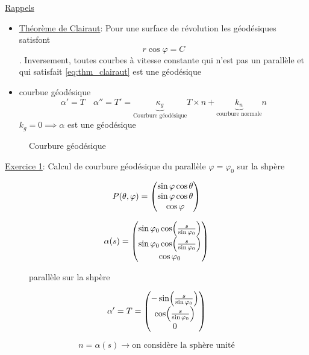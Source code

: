 



\underline{Rappels} 

\begin{itemize}

\item \underline{Théorème de Clairaut}: Pour une surface de révolution les géodésiques satisfont \begin{equation*}
	r\cos\varphi =C \tag{*} \label{eq:thm_clairaut}
\end{equation*}. Inversement, toutes courbes à vitesse constante qui n'est pas un parallèle et qui satisfait \eqref{eq:thm_clairaut} est une géodésique

\item courbue géodésique $$\alpha'=T \quad \alpha'' =T' = \underbrace{\kappa_{g}}_{\text{Courbure géodésique}}  T \times  n + \underbrace{k_{n}}_{\text{courbure normale}} n $$ $k_{g} = 0 \implies \alpha$ est une géodésique 
\end{itemize}
	

\begin{figure}[ht]
    \centering
    \caption{Courbure géodésique}
    \label{fig:courbure-géodésique}
\end{figure}


\underline{Exercice 1}: Calcul de courbure géodésique du parallèle $\varphi = \varphi_{0} $ sur la shpère

$$P(\theta, \varphi) = \begin{pmatrix} \sin\varphi\cos\theta\\\sin\varphi\cos\theta\\\cos\varphi \end{pmatrix} $$ 

$$\alpha(s) = \begin{pmatrix} \sin\varphi_{0} \cos(\frac{s}{\sin\varphi_{0} } )\\\sin\varphi_{0} \cos(\frac{s}{\sin\varphi_{0}} ) \\\cos\varphi_{0}  \end{pmatrix}$$ 

\begin{figure}[ht]
    \centering
    \caption{parallèle sur la shpère}
    \label{fig:parallèle-sur-la-shpère}
\end{figure}

$$\alpha' = T = \begin{pmatrix} -\sin(\frac{s}{\sin\varphi_{0}}) \\ \cos(\frac{s}{\sin\varphi_{0} }) \\0 \end{pmatrix} $$ 

$$n = \alpha(s) \to \text{on considère la sphère unité} $$ 

